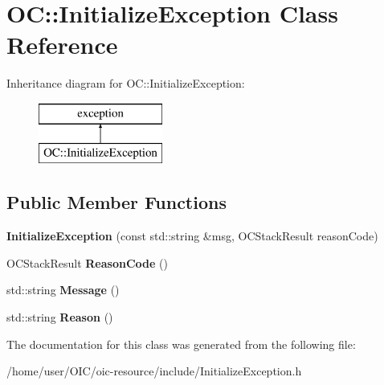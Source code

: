 \hypertarget{classOC_1_1InitializeException}{}\section{O\+C\+:\+:Initialize\+Exception Class Reference}
\label{classOC_1_1InitializeException}
Inheritance diagram for O\+C\+:\+:Initialize\+Exception\+:\begin{figure}[H]
\begin{center}
\leavevmode
\includegraphics[height=2.000000cm]{classOC_1_1InitializeException}
\end{center}
\end{figure}
\subsection*{Public Member Functions}
\begin{DoxyCompactItemize}
\item 
\hypertarget{classOC_1_1InitializeException_ae1382f57abb002b31e86d43bcc205b61}{}{\bfseries Initialize\+Exception} (const std\+::string \&msg, O\+C\+Stack\+Result reason\+Code)\label{classOC_1_1InitializeException_ae1382f57abb002b31e86d43bcc205b61}

\item 
\hypertarget{classOC_1_1InitializeException_ad9cbcd5ea5edcbee2f7a77cee6d40159}{}O\+C\+Stack\+Result {\bfseries Reason\+Code} ()\label{classOC_1_1InitializeException_ad9cbcd5ea5edcbee2f7a77cee6d40159}

\item 
\hypertarget{classOC_1_1InitializeException_a1bf3ad555a5515d5def6294bf15fc20c}{}std\+::string {\bfseries Message} ()\label{classOC_1_1InitializeException_a1bf3ad555a5515d5def6294bf15fc20c}

\item 
\hypertarget{classOC_1_1InitializeException_a357ac2415acc1215db488291820c770c}{}std\+::string {\bfseries Reason} ()\label{classOC_1_1InitializeException_a357ac2415acc1215db488291820c770c}

\end{DoxyCompactItemize}


The documentation for this class was generated from the following file\+:\begin{DoxyCompactItemize}
\item 
/home/user/\+O\+I\+C/oic-\/resource/include/Initialize\+Exception.\+h\end{DoxyCompactItemize}
